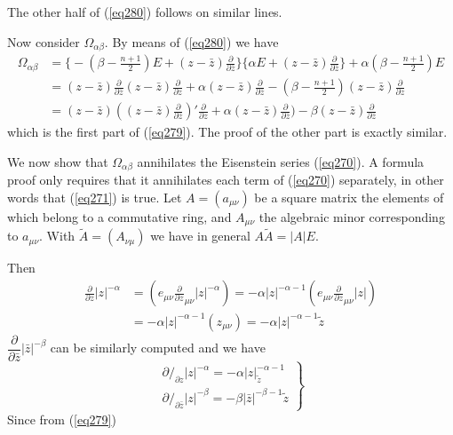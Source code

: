 The other half of (\ref{eq280}) follows on similar lines.

Now consider $\Omega_{\alpha \beta}$. By means of (\ref{eq280}) we have 
\begin{align*}
\Omega_{\alpha \beta} & =
\bigg\{-(\beta-\frac{n+1}{2})E+(z-\bar{z})\frac{\partial}{\partial
  \bar{z}} \bigg\}\bigg \{ \alpha
E+(z-\bar{z})\frac{\partial}{\partial \bar{z}} \bigg\}+\alpha(\beta
-\frac{n+1}{2})E \\ 
& = (z-\bar{z})\frac{\partial}{\partial
  \bar{z}}(z-\bar{z})\frac{\partial}{\partial z}+\alpha
(z-\bar{z})\frac{\partial}{\partial \bar{z}}-(\beta -
\frac{n+1}{2})(z-\bar{z})\frac{\partial}{\partial z}\\ 
& = (z-\bar{z})((z-\bar{z})\frac{\partial}{\partial \bar{z}})'
\frac{\partial}{\partial z}+\alpha (z-\bar{z})\frac{\partial}{\partial
  \bar{z}})-\beta (z-\bar{z})\frac{\partial}{\partial \bar{z}} 
\end{align*}
which is the first part of (\ref{eq279}). The proof of the other part is
exactly similar. 

We now show that $\Omega_{\alpha \beta}$ annihilates the Eisenstein
series (\ref{eq270}). A formula proof only requires that it annihilates each
term of (\ref{eq270}) separately, in other words that (\ref{eq271}) is true. Let
$A=(a_{\mu \nu})$ be a square matrix the elements of which belong to a
commutative ring, and $A_{\mu \nu }$ the algebraic minor corresponding
to $a_{\mu \nu}$. With $\tilde{A}=(A_{\nu \mu})$ we have in general $A
\tilde{A}=|A|E$. 

Then
\begin{align*}
\frac{\partial}{\partial z}|z|^{-\alpha} & = (e_{\mu
  \nu}\frac{\partial}{\partial z}_{\mu \nu}|z|^{- \alpha}) = - \alpha
|z|^{- \alpha -1}(e_{\mu \nu}\frac{\partial}{\partial z}_{\mu
  \nu}|z|)\\ 
& = -\alpha |z|^{- \alpha-1}(z_{\mu \nu})=-\alpha |z|^{- \alpha -1}\tilde{z}
\end{align*}\pageoriginale 
$\dfrac{\partial}{\partial \bar{z}}|\bar{z}|^{- \beta}$ can be
similarly computed and we have 
\begin{equation*}
\left. \tag{281}\label{eq281}   
\begin{aligned}
\partial/_{\partial z}|z|^{- \alpha} = - \alpha |z|^{- \alpha -1}_{\tilde{z}} \\
\partial/_{\partial \bar{z}} |z|^{-\beta} = - \beta |\bar{z}|^{-\beta
  -1}{\tilde{z}} 
\end{aligned}
\right \}
\end{equation*}
Since from (\ref{eq279})

